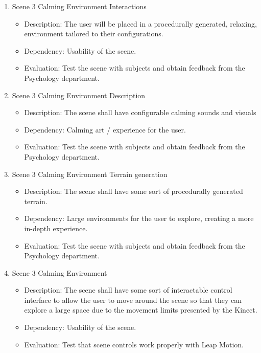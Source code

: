 \documentclass[a4paper,10pt]{article}
\begin{document}
\begin{enumerate}
		\item Scene 3 Calming Environment Interactions
		\begin{itemize}
		\item Description: The user will be placed in a procedurally generated, relaxing, environment tailored to their configurations.
		\item Dependency: Usability of the scene.
		\item Evaluation: Test the scene with subjects and obtain feedback from the Psychology department. 
		\end{itemize}
		
		\item Scene 3 Calming Environment Description 
		\begin{itemize}
		\item Description: The scene shall have configurable calming sounds and visuals
		\item Dependency: Calming art / experience for the user.
		\item Evaluation: Test the scene with subjects and obtain feedback from the Psychology department. 
		\end{itemize}
		
		\item Scene 3 Calming Environment Terrain generation
		\begin{itemize}
		\item Description: The scene shall have some sort of procedurally generated terrain. 
		\item Dependency: Large environments for the user to explore, creating a more in-depth experience.
		\item Evaluation: Test the scene with subjects and obtain feedback from the Psychology department. 
		\end{itemize}
		
		\item Scene 3 Calming Environment 
		\begin{itemize}
		\item Description: The scene shall have some sort of interactable control interface to allow the user to move around the scene so that they can explore a large space due to the movement limits presented by the Kinect.
		\item Dependency: Usability of the scene.
		\item Evaluation: Test that scene controls work properly with Leap Motion. 
		\end{itemize}
		
		
	\end{enumerate}
\end{document}
